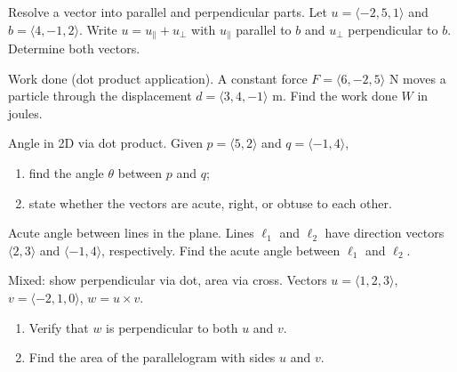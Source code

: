 \documentclass[11pt]{article}
\def\textbf#1{#1}%
\def\mathbf#1{#1}%
\newcounter{question}
\begin{document}
\begin{question}
\textbf{Resolve a vector into parallel and perpendicular parts.}
Let \(\mathbf{u}=\langle -2,5,1\rangle\) and \(\mathbf{b}=\langle 4,-1,2\rangle\).
Write \(\mathbf{u}=\mathbf{u}_{\parallel}+\mathbf{u}_{\perp}\) with \(\mathbf{u}_{\parallel}\) parallel to \(\mathbf{b}\) and \(\mathbf{u}_{\perp}\) perpendicular to \(\mathbf{b}\). Determine both vectors.
\end{question}

\begin{question}
\textbf{Work done (dot product application).}
A constant force \(\mathbf{F}=\langle 6,-2,5\rangle\) N moves a particle through the displacement \(\mathbf{d}=\langle 3,4,-1\rangle\) m.
Find the work done \(W\) in joules.
\end{question}

\begin{question}
\textbf{Angle in 2D via dot product.}
Given \(\mathbf{p}=\langle 5,2\rangle\) and \(\mathbf{q}=\langle -1,4\rangle\),
\begin{enumerate}
  \item find the angle \(\theta\) between \(\mathbf{p}\) and \(\mathbf{q}\);
  \item state whether the vectors are acute, right, or obtuse to each other.
\end{enumerate}
\end{question}

\begin{question}
\textbf{Acute angle between lines in the plane.}
Lines \(\ell_1\) and \(\ell_2\) have direction vectors \(\langle 2,3\rangle\) and \(\langle -1,4\rangle\), respectively.
Find the acute angle between \(\ell_1\) and \(\ell_2\).
\end{question}

\begin{question}
\textbf{Mixed: show perpendicular via dot, area via cross.}
Vectors \(\mathbf{u}=\langle 1,2,3\rangle\), \(\mathbf{v}=\langle -2,1,0\rangle\), \(\mathbf{w}=\mathbf{u}\times\mathbf{v}\).
\begin{enumerate}
  \item Verify that \(\mathbf{w}\) is perpendicular to both \(\mathbf{u}\) and \(\mathbf{v}\).
  \item Find the area of the parallelogram with sides \(\mathbf{u}\) and \(\mathbf{v}\).
\end{enumerate}
\end{question}
\end{document}
